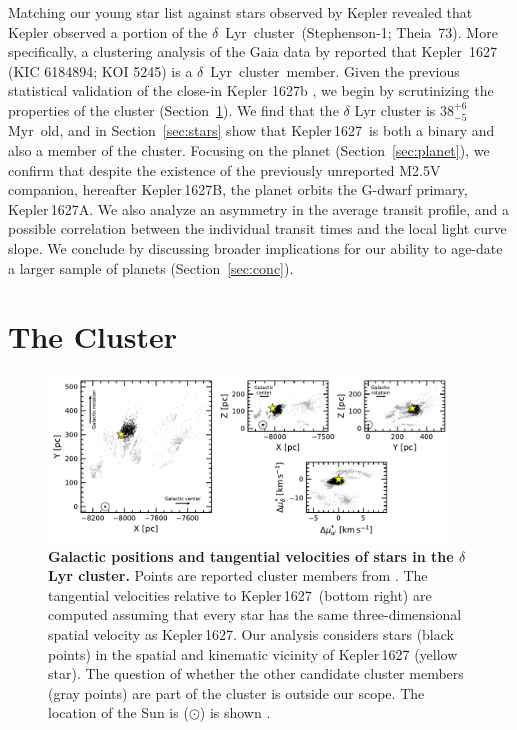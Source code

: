 \documentclass[12pt,modern,twocolumn,tighten,linenumbers]{aastex63}
\newcommand{\cn}{$\delta$\ Lyr\ cluster} %
\newcommand{\sn}{Kepler\,1627} %
\newcommand{\clusterage}{$38^{+6}_{-5}$\,Myr} %
\begin{document}
Matching our young star list against stars observed by Kepler revealed
that Kepler observed a portion of the \cn\ (Stephenson-1; Theia~73).
More specifically, a clustering analysis of the Gaia data by
\citet{KounkelCovey2019} reported that Kepler~1627 (KIC 6184894; KOI
5245) is a \cn\ member.  Given the previous statistical
validation of the close-in  Kepler 1627b
\citep{2012ApJS..199...24T,morton_false_2016,thompson_planetary_2018},
we begin by scrutinizing the properties of the cluster
(Section~\ref{sec:cluster}).  We find that the $\delta$ Lyr cluster is
\clusterage\ old, and in Section~\ref{sec:stars} show that \sn\ is
both a binary and also a member of the cluster.  Focusing on the
planet (Section~\ref{sec:planet}), we confirm that despite the
existence of the previously unreported M2.5V companion, hereafter
Kepler\,1627B, the planet orbits the G-dwarf primary, Kepler\,1627A.
We also analyze an asymmetry in the average transit profile, and a
possible correlation between the individual transit times and the
local light curve slope.  We conclude by discussing broader
implications for our ability to age-date a larger sample of planets
(Section~\ref{sec:conc}).


\section{The Cluster}
\label{sec:cluster}

\begin{figure}[t]
	\begin{center}
		\leavevmode
		\includegraphics[width=0.95\textwidth]{f1.pdf}
	\end{center}
	\vspace{-0.7cm}
	\caption{
    {\bf Galactic positions  and tangential velocities of stars in the
    $\delta$\,Lyr cluster.} Points are reported cluster members from
    \citet{KounkelCovey2019}.  The tangential velocities relative to
    \sn\ (bottom right) are computed assuming that every star has the
    same three-dimensional spatial velocity as \sn.  Our analysis
    considers stars (black points) in the spatial and kinematic
    vicinity of Kepler\,1627 (yellow star).  The question of whether
    the other candidate cluster members (gray points) are part of the
    cluster is outside our scope.  The location of the Sun is
    ($\odot$) is shown .
		\label{fig:XYZvtang}
	}
\end{figure}
\end{document}
